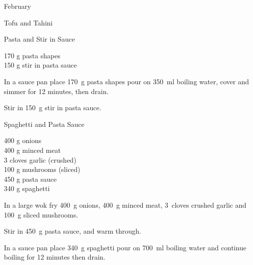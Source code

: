 \begin{menu}{February}
\begin{recipe}{2}{Tofu and Tahini}
\begin{instructions}
    \end{instructions}
    \end{recipe}%
  
    \begin{recipe}{1}{Pasta and Stir in Sauce}%
		\begin{ingredients}
		170 g pasta shapes  \\
	150 g stir in pasta sauce  \\
	
		\end{ingredients}
	
	
    \begin{instructions}
    \item 
    In a
    sauce pan
    place
    170~g  pasta shapes
    pour on
    350~ml  boiling water,
    cover and simmer for 12 minutes, then drain.
  \item 
        Stir in
        150~g  stir in pasta sauce.
      
    \end{instructions}
    \end{recipe}%
  
    \begin{recipe}{2}{Spaghetti and Pasta Sauce}%
		\begin{ingredients}
		400 g onions  \\
	400 g minced meat  \\
	3 cloves garlic (crushed) \\
	100 g mushrooms (sliced) \\
	450 g pasta sauce  \\
	340 g spaghetti  \\
	
		\end{ingredients}
	
	
	
    \begin{instructions}
    \item 
        In a large wok fry
        400~g  onions,
        400~g  minced meat,
        3~cloves crushed garlic
        and
        100~g sliced mushrooms.
      \item 
        Stir in
        450~g  pasta sauce,
        and warm through.
      \item 
    In a
    sauce pan
    place
    340~g  spaghetti
    pour on
    700~ml  boiling water
    and continue boiling for 12 minutes then drain.
  

\end{instructions}
\end{recipe}
\end{menu}
